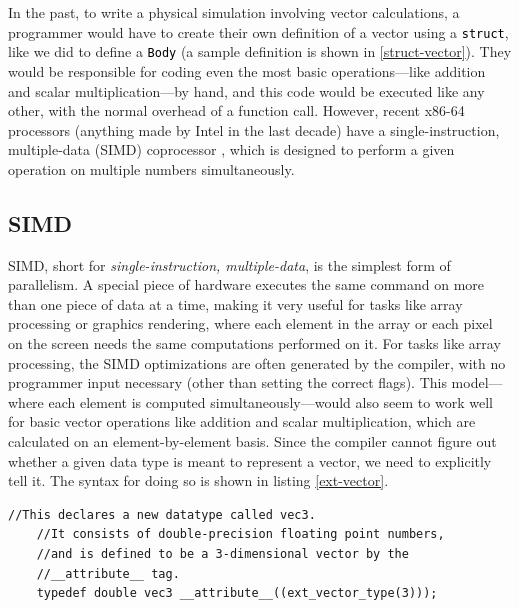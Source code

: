 \documentclass[12pt,twoside]{reedthesis}
\newcommand\code[1]{\colorbox{light-gray}{\texttt{\textcolor{black}{#1}}}}
\begin{document}


In the past, to write a physical simulation involving vector calculations, a programmer would have to create their own definition of a vector using a \code{struct}, like we did to define a \code{Body} (a sample definition is shown in \ref{struct-vector}). They would be responsible for coding even the most basic operations---like addition and scalar multiplication---by hand, and this code would be executed like any other, with the normal overhead of a function call. However, recent x86-64 processors (anything made by Intel in the last decade) have a single-instruction, multiple-data (SIMD) coprocessor \citep{intel-simd}, which is designed to perform a given operation on multiple numbers simultaneously.




\subsection{SIMD}
SIMD, short for \emph{single-instruction, multiple-data}, is the simplest form of parallelism. A special piece of hardware executes the same command on more than one piece of data at a time, making it very useful for tasks like array processing or graphics rendering, where each element in the array or each pixel on the screen needs the same computations performed on it. For tasks like array processing, the SIMD optimizations are often generated by the compiler, with no programmer input necessary (other than setting the correct flags). This model---where each element is computed simultaneously---would also seem to work well for basic vector operations like addition and scalar multiplication, which are calculated on an element-by-element basis. Since the compiler cannot figure out whether a given data type is meant to represent a vector, we need to explicitly tell it. The syntax for doing so is shown in listing \ref{ext-vector}.


\begin{lstlisting}[caption={The declaration for EXT vector types. These vectors are
    not part of standard C, but are available on nearly all modern systems using the \code{clang} compiler.\label{ext-vector}}]
    //This declares a new datatype called vec3.
    //It consists of double-precision floating point numbers,
    //and is defined to be a 3-dimensional vector by the
    //__attribute__ tag.
    typedef double vec3 __attribute__((ext_vector_type(3)));
\end{lstlisting}
\end{document}

